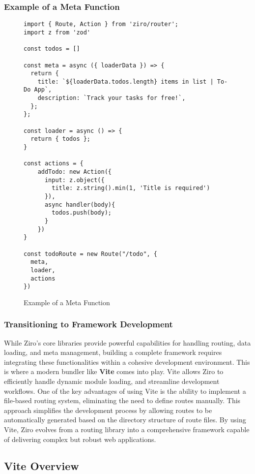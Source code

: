 \pagebreak
\subsubsection*{Example of a Meta Function}
\begin{figure}[h!]
\begin{verbatim}
import { Route, Action } from 'ziro/router';
import z from 'zod'

const todos = []

const meta = async ({ loaderData }) => {
  return {
    title: `${loaderData.todos.length} items in list | To-Do App`,
    description: `Track your tasks for free!`,
  };
};

const loader = async () => {
  return { todos };
}

const actions = {
    addTodo: new Action({
      input: z.object({
        title: z.string().min(1, 'Title is required')
      }),
      async handler(body){
        todos.push(body);
      }
    })
}

const todoRoute = new Route("/todo", {
  meta,
  loader,
  actions
})
\end{verbatim}
\caption{Example of a Meta Function}
\end{figure}

\pagebreak

\subsubsection{Transitioning to Framework Development}

While Ziro's core libraries provide powerful capabilities for handling routing, data loading, and meta management, building a complete framework requires integrating these functionalities within a cohesive development environment. This is where a modern bundler like \textbf{Vite} comes into play. Vite allows Ziro to efficiently handle dynamic module loading, and streamline development workflows. One of the key advantages of using Vite is the ability to implement a file-based routing system, eliminating the need to define routes manually. This approach simplifies the development process by allowing routes to be automatically generated based on the directory structure of route files. By using Vite, Ziro evolves from a routing library into a comprehensive framework capable of delivering complex but robust web applications.


\subsection{Vite Overview}

